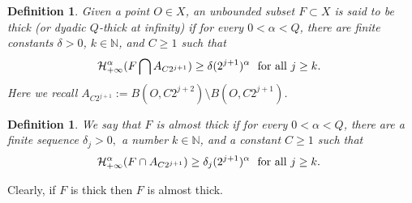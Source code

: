 \documentclass[10pt]{amsart}
\newtheorem{definition}[theorem]{Definition}
\numberwithin{equation}{section}
\begin{document}
\begin{definition}\label{def:ThickSets}
Given a point $O\in X$, an unbounded subset $F\subset X$ is said to be \emph{thick} (or \emph{dyadic $Q$-thick at infinity}) if for every $0<\alpha<Q$,  there are finite  constants $\delta>0$,  $k \in\mathbb N$, and $C\geq 1$ such that
 \begin{equation}\label{thick}
 	\mathcal H^{\alpha}_{+\infty}(F\bigcap A_{C2^{j+1}}) \geq \delta (2^{j+1})^{\alpha}  \text{\rm \ \    for all $j\geq k$. 
	}
 \end{equation}
Here we recall $A_{C2^{j+1}}:=B(O,C2^{j+2})\setminus B(O,C2^{j+1})$.
\end{definition}

\begin{definition}\label{def:almost-thick}
 We say that $F$ is  {\it almost thick} if for every $0<\alpha<Q$, there are a finite sequence $\delta_j>0,$ a number $k\in\mathbb N$, and a constant $C\geq 1$ 
 such that 
 \begin{equation}
 \label{almost-thick}
 \mathcal H^{\alpha}_{+\infty} (F\cap A_{C2^{j+1}}) \geq \delta_j (2^{j+1})^\alpha \text{\rm \ \ for all $j\geq k$.
 }
 \end{equation}
\end{definition}
Clearly, if $F$ is thick then $F$ is almost thick. 
\end{document}
